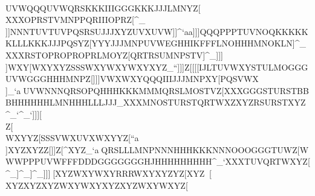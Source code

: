 \\UVWQQQUVWQRSKKKIIIGGGKKKJJJLMNYZ[                                                            \\\JJJMNOOPRNNNQRSKKKFFFMMMHHHGGGZ[]                                                            XXXOPRSTVMNPPQRIIIOPRZ[\RSUTUVMNP[\^                                                            \\\[\\XYZYZ[[\]YZ[TTTWXYWXYWXYWXY_``                                                            \\\[\]WXYYZ[YZ[ZZ[YZ[YZ[[[\XYZZZ[[\]                                                            \\\YZ[WXY[\]UVWUVXWXYXYZXYZRRRXYZ]^_                                                            \\\QRSJKMLNOPQSOPQIIINOQQRSFFFKKKYZ[                                                            ]]]NNNTUVTUVPQSRSUJJJXYZUVXUVW]]^`aa                                                            ]]]QQQPPPTUVNOQKKKKKKLLLKKKJJJPQSYZ[                                                            YYYJJJMNPUVWEGHHIKFFFLNOHHHMNOKLN]^_                                                            XXXRSTOPROPROPRLMOYZ[QRTRSUMNPSTV]^_                                                            ]]]\\]WXY[\]WXYXYZSSSWXYWXYWXYXYZ_``                                                            ]]]Z[\XYZXYZYZ[XYZXYZZ[\YZ[XYZXYZ\]^                                                            \\\YZ[ZZ\Z[\UVXXYZUVXWXYUVWVVVRRRZ[]                                                            [[[IJLTUVWXYSTULMOGGGUVWGGGHHHMNPZ[\                                                            ]]]VWXWXYQQQIIIJJJMNPXY[PQSVWX\\]_`a                                                            ^^^UVWNNNQRSOPQHHHKKKMMMQRSLMOSTVZ[\                                                            XXXGGGSTURSTBBBHHHHHHLMNHHHLLLJJJ\]_                                                            XXXMNOSTURSTQRTWXZXYZRSURSTXYZ^_`^_`                                                            ]]][\\Z[\[\]WXYYZ[SSSVWXUVXWXYYZ[``a                                                            ^^^\\]XYZXYZZ[\XYZYZ[XYZWXYXYZXYZZ[\                                                            \\\]^_[\]VWXUVWVWXWXYWXYWXYRRRQQQ_`a                                                            [[[QRTSTVPQRMMMGGGJJJRSUHHHKKKNNNZ[\                                                            ]]]Z[\WXYOPQLMOSTVQRTSTVOPQ\]^XYZ_`a                                                            ^^^QRSLLLMNPNNNHHHKKKNNNOOOGGGTUWZ[\                                                            WWWPPPUVWFFFDDDGGGGGGGHJHHHHHHHHH^_`                                                            XXXTUVQRTWXYZ[\YZ[VWYXYZ[\]]^_]^_]^_                                                            ]]]^^_[\]XYZWXYWXYRRRWXYXYZYZ[XYZ^^_                                                            ^^^[\\XYZXYZXYZWXYWXYXYZXYZWXYWXYZ[\     